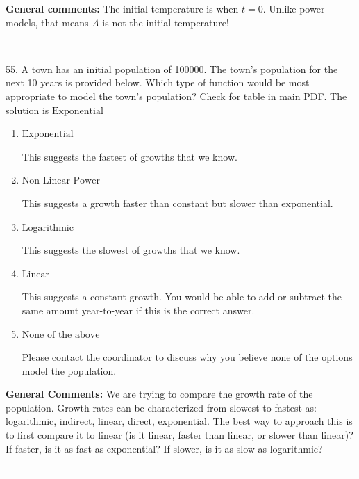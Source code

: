 \documentclass{extbook}[14pt]
\begin{document}
\textbf{General comments:} The initial temperature is when $t = 0$. Unlike power models, that means $A$ is not the initial temperature!

-----------------------------------------------

55. A town has an initial population of 100000. The town's population for the next 10 years is provided below. Which type of function would be most appropriate to model the town's population?
Check for table in main PDF. 
The solution is $ \text{Exponential} $ 

\begin{enumerate}[label=\Alph*.] 
\item $ \text{Exponential} $ 

 This suggests the fastest of growths that we know. 
\item $ \text{Non-Linear Power} $ 

 This suggests a growth faster than constant but slower than exponential. 
\item $ \text{Logarithmic} $ 

 This suggests the slowest of growths that we know. 
\item $ \text{Linear} $ 

 This suggests a constant growth. You would be able to add or subtract the same amount year-to-year if this is the correct answer. 
\item $ \text{None of the above} $ 

 Please contact the coordinator to discuss why you believe none of the options model the population. 
\end{enumerate} 
 
\textbf{General Comments:} We are trying to compare the growth rate of the population. Growth rates can be characterized from slowest to fastest as: logarithmic, indirect, linear, direct, exponential. The best way to approach this is to first compare it to linear (is it linear, faster than linear, or slower than linear)? If faster, is it as fast as exponential? If slower, is it as slow as logarithmic?

-----------------------------------------------
\end{document}
